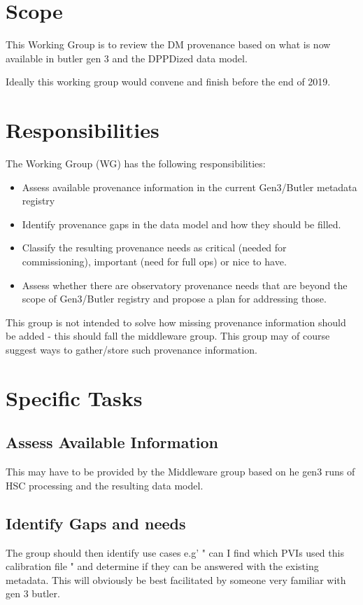 
\section{Scope}

This Working Group is to review the \gls{DM} \gls{provenance} based on what is now
available in butler gen 3 and the DPPDized data model.

 Ideally this working group would convene and finish before the end of 2019.

\section{Responsibilities}

The Working Group (\gls{WG}) has the following responsibilities:

\begin{itemize}
    \item Assess available \gls{provenance} information in the current Gen3/\gls{Butler} \gls{metadata} registry
    \item Identify \gls{provenance} gaps in the data model and how they should be filled.
    \item Classify the resulting \gls{provenance} needs as critical (needed for commissioning), important (need for full ops) or nice to have.
    \item Assess whether there are observatory provenance needs that are beyond  the scope of Gen3/\gls{Butler} registry and propose a plan for addressing those.
\end{itemize}

This group is not intended to solve how missing \gls{provenance} information should be added - this should fall the middleware group.
This group may of course suggest ways to gather/store such \gls{provenance} information.

\section{Specific Tasks}

\subsection{ Assess Available Information}

This may have to be provided by the Middleware group based on he gen3 runs of \gls{HSC} processing and the
resulting data model.

\subsection{Identify Gaps and needs}
The group should then identify use cases e.g' " can I find which PVIs used this \gls{calibration} file " and determine if they can be answered with the existing \gls{metadata}. This will obviously be best facilitated by someone very familiar with gen 3 butler.

